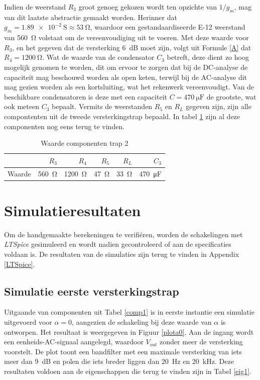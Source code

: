 \documentclass{report}
\begin{document}
Indien de weerstand $R_{3}$ groot genoeg gekozen wordt ten opzichte van $1/g_{m}$, mag van dit laatste abstractie gemaakt worden. Herinner dat $g_m = \SI{1.89e-2}{\siemens} \approx \SI{53}{\ohm}$, waardoor een gestandaardiseerde E-12 weerstand van \SI{560}{\ohm} volstaat om de vereenvoudiging uit te voeren. Met deze waarde voor $R_3$, en het gegeven dat de versterking \SI{6}{\deci\bel} moet zijn, volgt uit Formule \ref{A} dat $R_4 = \SI{1200}{\ohm}$. Wat de waarde van de condensator $C_3$ betreft, deze dient zo hoog mogelijk genomen te worden, dit om ervoor te zorgen dat bij de DC-analyse de capaciteit mag beschouwd worden als open keten, terwijl bij de AC-analyse dit mag gezien worden als een kortsluiting, wat het rekenwerk vereenvoudigt. Van de beschikbare condensatoren is deze met een capaciteit $C = \SI{470}{\micro\farad}$ de grootste, wat ook meteen $C_3$ bepaalt. Vermits de weerstanden $R_5$ en $R_L$ gegeven zijn, zijn alle compontenten uit de tweede versterkingstrap bepaald. In tabel \ref{comp2} zijn al deze componenten nog eens terug te vinden.

\begin{table}[h]
    \centering

    \begin{tabular}{lrrrrr}
    \toprule
    & $R_3$ & $R_4$ & $R_5$ & $R_L$ & $C_3$ \\
    \midrule
    Waarde & \SI{560}{\ohm} & \SI{1200}{\ohm} &  \SI{47}{\ohm} & \SI{33}{\ohm} & \SI{470}{\micro\farad} \\
    \bottomrule
    \end{tabular}
    \caption{Waarde componenten trap 2}
    \label{comp2}
\end{table}

\chapter{Simulatieresultaten}

Om de handgemaakte berekeningen te verifiëren, worden de schakelingen met \textit{LTSpice} gesimuleerd  en wordt nadien gecontroleerd of aan de specificaties voldaan is. De resultaten van de simulaties zijn terug te vinden in Appendix \ref{LTSpice}. 

\section{Simulatie eerste versterkingstrap}
Uitgaande van componenten uit Tabel \ref{comp1} is in eerste instantie een simulatie uitgevoerd voor $\alpha = 0$, aangezien de schakeling bij deze waarde van $\alpha$ is ontworpen. Het resultaat is weergegeven in Figuur \ref{plota0}. Aan de ingang wordt een eenheids-AC-signaal aangelegd, waardoor $V_{out}$ zonder meer de versterking voorstelt. De plot toont een bandfilter met een maximale versterking van iets meer dan \SI{9}{\deci\bel} en polen die iets breder liggen dan \SI{20}{\hertz} en \SI{20}{\kilo\hertz}. Deze resultaten voldoen aan de eigenschappen die terug te vinden zijn in Tabel \ref{eig1}.
\end{document}
